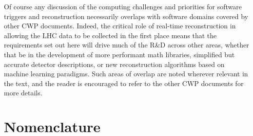 Of course any discussion of the computing challenges and priorities for software triggers and reconstruction necessarily overlaps with software domains covered by other CWP documents. Indeed, the critical role of real-time reconstruction in allowing the LHC data to be collected in the first place means that the requirements set out here will drive much of the R\&D across other areas, whether that be in the development of more performant math libraries, simplified but accurate detector descriptions, or new reconstruction algorithms based on machine learning paradigms. Such areas of overlap are noted wherever relevant in the text, and the reader is encouraged to refer to the other CWP documents for more details.

\section{Nomenclature}

